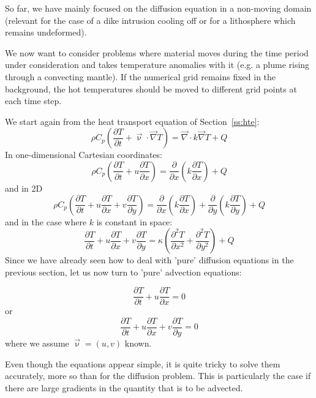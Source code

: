 
So far, we have mainly focused on the diffusion equation in a non-moving domain 
(relevant for the case of a dike intrusion cooling off 
or for a lithosphere which remains undeformed). 

We now want to consider problems where material moves during the time period under 
consideration and takes temperature anomalies with it (e.g. a plume rising 
through a convecting mantle). 
If the numerical grid remains fixed in the background, the hot temperatures should 
be moved to different grid points at each time step. 

We start again from the heat transport equation of Section~\ref{ss:hte}:
\begin{equation}
\rho C_p \left( \frac{\partial T}{\partial t} + \vec\upnu \cdot \vec\nabla T  \right)=
\vec\nabla \cdot k \vec\nabla T + Q 
\end{equation}
In one-dimensional Cartesian coordinates:
\begin{equation}
\rho C_p \left( \frac{\partial T}{\partial t}  
+ u \frac{\partial T}{\partial x} \right)= 
\frac{\partial }{\partial x} \left(  k  \frac{\partial T}{\partial x} \right)+ Q
\end{equation}
and in 2D
\begin{equation}
\rho C_p \left( \frac{\partial T}{\partial t}   
+ u \frac{\partial T}{\partial x}  
+ v \frac{\partial T}{\partial y} \right) 
=
\frac{\partial }{\partial x} \left(  k  \frac{\partial T}{\partial x} \right)
+
\frac{\partial }{\partial y} \left(  k  \frac{\partial T}{\partial y} \right)
+Q
\end{equation}
and in the case where $k$ is constant in space:
\begin{equation}
\frac{\partial T}{\partial t}   
+ u \frac{\partial T}{\partial x}  
+ v \frac{\partial T}{\partial y} 
=
\kappa \left( 
\frac{\partial^2 T}{\partial x^2} 
+ \frac{\partial^2 T}{\partial y^2} \right) +Q
\end{equation}
Since we have already seen how to deal with 'pure' diffusion equations in the 
previous section, let us now turn to 'pure' advection equations:

\begin{equation}
\frac{\partial T}{\partial t}  + u \frac{\partial T}{\partial x} = 0
\end{equation}
or
\begin{equation}
\frac{\partial T}{\partial t}  + u \frac{\partial T}{\partial x} + v \frac{\partial T}{\partial y}= 0
\end{equation}
where we assume $\vec\upnu=(u,v)$ known. 

Even though the equations appear simple, it is quite tricky to solve them accurately, 
more so than for the diffusion problem. 
This is particularly the case if there are large gradients in the quantity that is to be advected. 





